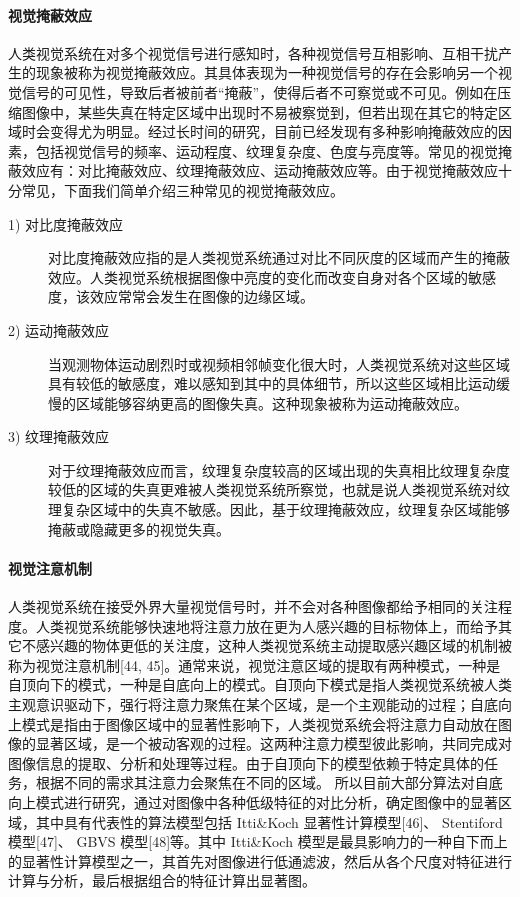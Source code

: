   \paragraph{视觉掩蔽效应} 人类视觉系统在对多个视觉信号进行感知时，各种视觉信号互相影响、互相干扰产生的现象被称为视觉掩蔽效应。其具体表现为一种视觉信号的存在会影响另一个视觉信号的可见性，导致后者被前者“掩蔽”，使得后者不可察觉或不可见。例如在压缩图像中，某些失真在特定区域中出现时不易被察觉到，但若出现在其它的特定区域时会变得尤为明显。经过长时间的研究，目前已经发现有多种影响掩蔽效应的因素，包括视觉信号的频率、运动程度、纹理复杂度、色度与亮度等。常见的视觉掩蔽效应有：对比掩蔽效应、纹理掩蔽效应、运动掩蔽效应等。由于视觉掩蔽效应十分常见，下面我们简单介绍三种常见的视觉掩蔽效应。
  \begin{description}
    \item [1) 对比度掩蔽效应]
    对比度掩蔽效应指的是人类视觉系统通过对比不同灰度的区域而产生的掩蔽效应。人类视觉系统根据图像中亮度的变化而改变自身对各个区域的敏感度，该效应常常会发生在图像的边缘区域。
    \item [2) 运动掩蔽效应]
    当观测物体运动剧烈时或视频相邻帧变化很大时，人类视觉系统对这些区域具有较低的敏感度，难以感知到其中的具体细节，所以这些区域相比运动缓慢的区域能够容纳更高的图像失真。这种现象被称为运动掩蔽效应。
    \item [3) 纹理掩蔽效应]
    对于纹理掩蔽效应而言，纹理复杂度较高的区域出现的失真相比纹理复杂度较低的区域的失真更难被人类视觉系统所察觉，也就是说人类视觉系统对纹理复杂区域中的失真不敏感。因此，基于纹理掩蔽效应，纹理复杂区域能够掩蔽或隐藏更多的视觉失真。
  \end{description}

  \paragraph{视觉注意机制} 人类视觉系统在接受外界大量视觉信号时，并不会对各种图像都给予相同的关注程度。人类视觉系统能够快速地将注意力放在更为人感兴趣的目标物体上，而给予其它不感兴趣的物体更低的关注度，这种人类视觉系统主动提取感兴趣区域的机制被称为视觉注意机制[44, 45]。通常来说，视觉注意区域的提取有两种模式，一种是自顶向下的模式，一种是自底向上的模式。自顶向下模式是指人类视觉系统被人类主观意识驱动下，强行将注意力聚焦在某个区域，是一个主观能动的过程；自底向上模式是指由于图像区域中的显著性影响下，人类视觉系统会将注意力自动放在图像的显著区域，是一个被动客观的过程。这两种注意力模型彼此影响，共同完成对图像信息的提取、分析和处理等过程。由于自顶向下的模型依赖于特定具体的任务，根据不同的需求其注意力会聚焦在不同的区域。 所以目前大部分算法对自底向上模式进行研究，通过对图像中各种低级特征的对比分析，确定图像中的显著区域，其中具有代表性的算法模型包括 Itti\&Koch 显著性计算模型[46]、 Stentiford 模型[47]、 GBVS 模型[48]等。其中 Itti\&Koch 模型是最具影响力的一种自下而上的显著性计算模型之一，其首先对图像进行低通滤波，然后从各个尺度对特征进行计算与分析，最后根据组合的特征计算出显著图。

